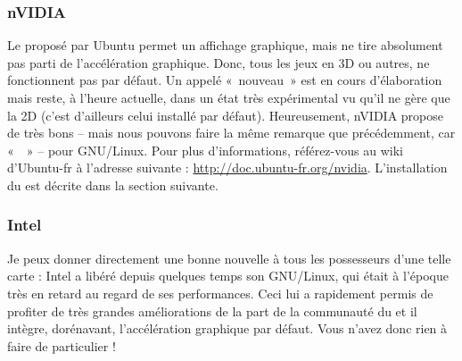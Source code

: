 \subsubsection{nVIDIA}
Le  proposé par Ubuntu permet un affichage graphique, mais ne tire absolument pas parti de l'accélération graphique. Donc, tous les jeux en 3D ou autres, ne fonctionnent pas par défaut. Un   appelé «~nouveau~» est en cours d'élaboration mais reste, à l'heure actuelle, dans un état très expérimental vu qu'il ne gère que la 2D (c'est d'ailleurs celui installé par défaut). Heureusement, nVIDIA propose de très bons   -- mais nous pouvons faire la même remarque que précédemment, car «~~» -- pour GNU/Linux. Pour plus d'informations, référez-vous au wiki d'Ubuntu-fr à l'adresse suivante : \url{http://doc.ubuntu-fr.org/nvidia}. L'installation du   est décrite dans la section suivante.
\subsubsection{Intel}
Je peux donner directement une bonne nouvelle à tous les possesseurs d'une telle carte : Intel a libéré depuis quelques temps son  GNU/Linux, qui était à l'époque très en retard au regard de ses performances. Ceci lui a rapidement permis de profiter de très grandes améliorations de la part de la communauté du  et il intègre, dorénavant, l'accélération graphique par défaut. Vous n'avez donc rien à faire de particulier !

